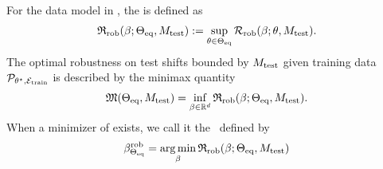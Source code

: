 \begin{definition}\label{def:PI-robust-loss}
    For the data model in , the \idRRs is defined as
    \begin{align}
    \label{eqn:PI-robust-loss} 
        \mathfrak{R}_{\mathrm{rob}}(\beta; \Theta_{\mathrm{eq}}, M_{\mathrm{test}}) :=   \sup_{\theta \in \Theta_{\mathrm{eq}}} \mathcal{R}_{\mathrm{rob}}  (\beta;\theta, M_{\mathrm{test}}). 
    \end{align}
The optimal robustness on test shifts bounded by $M_{\mathrm{test}}$ given training data $\mathcal{P}_{\theta^{\star}, \mathcal{E}_{\mathrm{train}}}$ is described by the minimax quantity 
\begin{align}
\label{eqn:minimax-quantity}
    \mathfrak{M}(\Theta_{\mathrm{eq}}, M_{\mathrm{test}})  = \inf_{\beta \in \mathbb{R}^d}\mathfrak{R}_{\mathrm{rob}}( \beta; \Theta_{\mathrm{eq}}, M_{\mathrm{test}} ).
\end{align}
When a minimizer of  exists, we call it the \idpred\, defined by
    \begin{equation}
        \beta^{\mathrm{rob}}_{\Theta_{\mathrm{eq}}} = \operatorname*{arg\,min}_\beta \mathfrak{R}_{\mathrm{rob}}(\beta; \Theta_{\mathrm{eq}}, M_{\mathrm{test}})
    \end{equation}
\end{definition}
